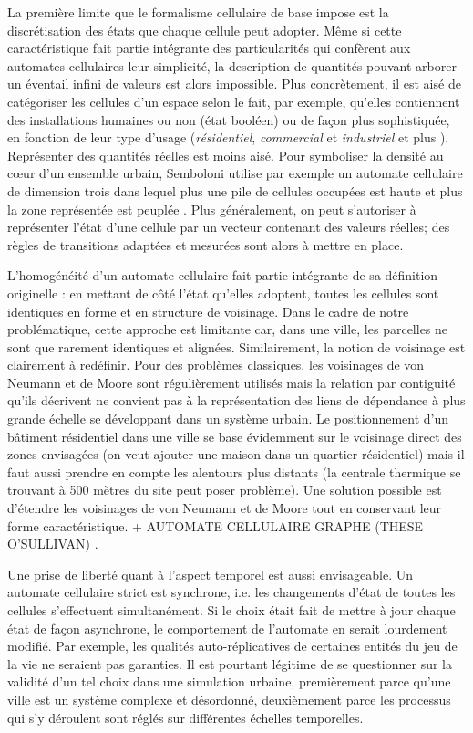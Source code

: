 \documentclass[10pt]{article}
\begin{document}
\begin{multicols}{2}
La première limite que le formalisme cellulaire de base impose est la
discrétisation des états que chaque cellule peut adopter. Même si
cette caractéristique fait partie intégrante des particularités qui
confèrent aux automates cellulaires leur simplicité, la description de
quantités pouvant arborer un éventail infini de valeurs est alors
impossible. Plus concrètement, il est aisé de catégoriser les cellules
d'un espace selon le fait, par exemple, qu'elles contiennent des
installations humaines ou non (état booléen)
\cite{Benguigui2004,Cornu} ou de façon plus sophistiquée, en fonction
de leur type d'usage (\textit{résidentiel}, \textit{commercial} et
\textit{industriel} \cite{Lechner} et plus
\cite{Dubos-Paillard203}). Représenter des quantités réelles est moins
aisé. Pour symboliser la densité au c\oe ur d'un ensemble urbain,
Semboloni utilise par exemple un automate cellulaire de dimension
trois dans lequel plus une pile de cellules occupées est haute et plus
la zone représentée est peuplée \cite{Semboloni2000}. Plus
généralement, on peut s'autoriser à représenter l'état d'une cellule
par un vecteur contenant des valeurs réelles; des règles de
transitions adaptées et mesurées sont alors à mettre en place.

L'homogénéité d'un automate cellulaire fait partie intégrante de sa
définition originelle : en mettant de côté l'état qu'elles adoptent,
toutes les cellules sont identiques en forme et en structure de
voisinage. Dans le cadre de notre problématique, cette approche est
limitante car, dans une ville, les parcelles ne sont que rarement
identiques et alignées. Similairement, la notion de voisinage est
clairement à redéfinir. Pour des problèmes classiques, les voisinages
de von Neumann et de Moore sont régulièrement utilisés mais la
relation par contiguité qu'ils décrivent ne convient pas à la
représentation des liens de dépendance à plus grande échelle se
développant dans un système urbain. Le positionnement d'un bâtiment
résidentiel dans une ville se base évidemment sur le voisinage direct
des zones envisagées (on veut ajouter une maison dans un quartier
résidentiel) mais il faut aussi prendre en compte les alentours plus
distants (la centrale thermique se trouvant à 500 mètres du site peut
poser problème). Une solution possible est d'étendre les voisinages de
von Neumann et de Moore tout en conservant leur forme
caractéristique. + AUTOMATE CELLULAIRE GRAPHE (THESE O'SULLIVAN)
\cite{O'Sullivan2000,0'Sullivan2001}.

Une prise de liberté quant à l'aspect temporel est aussi
envisageable. Un automate cellulaire strict est synchrone, i.e. les
changements d'état de toutes les cellules s'effectuent
simultanément. Si le choix était fait de mettre à jour chaque état de
façon asynchrone, le comportement de l'automate en serait lourdement
modifié. Par exemple, les qualités auto-réplicatives de certaines
entités du jeu de la vie ne seraient pas garanties. Il est pourtant
légitime de se questionner sur la validité d'un tel choix dans une
simulation urbaine, premièrement parce qu'une ville est un système
complexe et désordonné, deuxièmement parce les processus qui s'y
déroulent sont réglés sur différentes échelles temporelles.


\end{multicols}
\end{document}
